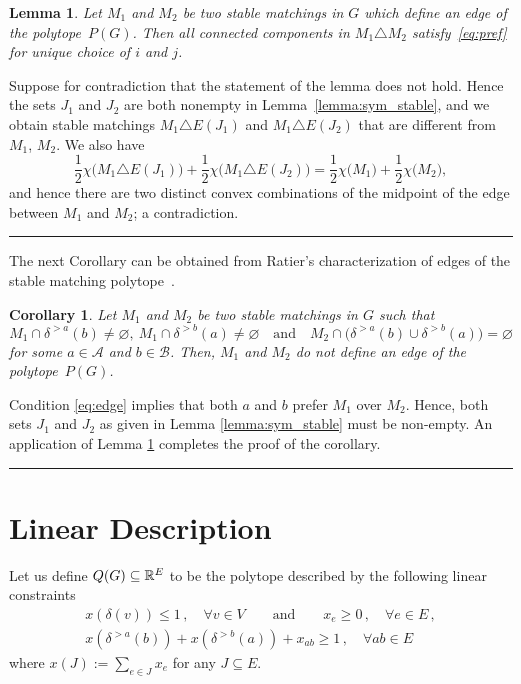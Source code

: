 \documentclass[3p,times]{elsarticle}
\newtheorem{lemma}[fact]{Lemma}
\newtheorem{corollary}[fact]{Corollary}
\newenvironment{proof}{{\bf Proof:  }}{\hfill\rule{2mm}{2mm}}
\begin{document}
\begin{lemma}\label{lemma:edge}
  Let $M_1$ and $M_2$ be two stable matchings in $G$ which define an
  edge of the polytope~$P(G)$. 
  Then all connected components in
  $M_1\triangle M_2$ satisfy~\eqref{eq:pref} for unique choice of $i$
  and $j$. 
\end{lemma}
\begin{proof}
  Suppose for contradiction that the statement of the lemma does not
  hold. Hence the sets $J_1$ and $J_2$ are both nonempty in
  Lemma~\ref{lemma:sym_stable}, and we obtain stable matchings
  $M_1\triangle E(J_1)$ and $M_1\triangle E(J_2)$ that are different from $M_1$,
  $M_2$. 
  We also have 
  \[ \frac{1}{2}\chi\big(M_1\triangle E(J_1)\big)+\frac{1}{2}\chi\big(M_1\triangle
  E(J_2)\big) =\frac{1}{2}\chi\big(M_1\big)+\frac{1}{2}\chi\big(M_2\big),\]
  and hence there are two distinct convex combinations of the midpoint
  of the edge between $M_1$ and $M_2$; a contradiction. 
\end{proof}

The next Corollary can be obtained from Ratier's characterization of edges of the stable matching polytope~\cite{ratier1996stable}.

\begin{corollary}\label{cor:edge}
Let $M_1$ and $M_2$ be two stable matchings in $G$ such that
\begin{equation}\label{eq:edge}
M_1\cap\delta^{>a}(b)\neq\varnothing,\
M_1\cap\delta^{>b}(a)\neq\varnothing\quad\text{and}\quad
M_2\cap\big(\delta^{>a}(b)\cup \delta^{>b}(a)\big)=\varnothing
\end{equation}
 for some $a\in\mathcal{A}$ and $b\in\mathcal{B}$. Then, $M_1$ and $M_2$ do not define an edge of the polytope~$P(G)$.
\end{corollary}
\begin{proof}
  Condition \eqref{eq:edge} implies that both $a$ and $b$ prefer
  $M_1$ over $M_2$. Hence, both sets $J_1$ and $J_2$ as given in Lemma
  \ref{lemma:sym_stable} must be non-empty. An application of Lemma
  \ref{lemma:edge} completes the proof of the corollary.
\end{proof}



\section{Linear Description}\label{section:theorem}
Let us define $Q(G)\subseteq\mathbb{R}^E$ to be the polytope described by the
following linear constraints
\begin{align}
  x(\delta(v)) \leq 1\,,\quad \forall v \in V\qquad \text{and} \qquad x_e \geq 0\,,\quad \forall e \in E\,,\label{eq:lin_descr_match}\\
  x(\delta^{>a}(b))+ x(\delta^{>b}(a)) + x_{ab} \geq 1\,, \quad \forall ab \in E \label{eq:lin_descr_stab}
\end{align}
where $x(J) := \sum_{e \in J} x_e$ for any $J \subseteq E$.
\end{document}
